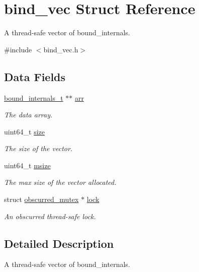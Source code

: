 \hypertarget{structbind__vec}{}\section{bind\+\_\+vec Struct Reference}
\label{structbind__vec}


A thread-\/safe vector of bound\+\_\+internals.  




{\ttfamily \#include $<$bind\+\_\+vec.\+h$>$}

\subsection*{Data Fields}
\begin{DoxyCompactItemize}
\item 
\hyperlink{structbound__internals__t}{bound\+\_\+internals\+\_\+t} $\ast$$\ast$ \hyperlink{structbind__vec_a8bf39e88ad9a1715c7e6cfa4fa8028f4}{arr}
\begin{DoxyCompactList}\small\item\em The data array. \end{DoxyCompactList}\item 
uint64\+\_\+t \hyperlink{structbind__vec_a322fa9fd253719971508bf013a668a64}{size}
\begin{DoxyCompactList}\small\item\em The size of the vector. \end{DoxyCompactList}\item 
uint64\+\_\+t \hyperlink{structbind__vec_aa45fa0f2e32261123f693541f26fc12b}{msize}
\begin{DoxyCompactList}\small\item\em The max size of the vector allocated. \end{DoxyCompactList}\item 
struct \hyperlink{structobscurred__mutex}{obscurred\+\_\+mutex} $\ast$ \hyperlink{structbind__vec_aed0bfcaa51d41aa82c371ab9aad863a6}{lock}
\begin{DoxyCompactList}\small\item\em An obscurred thread-\/safe lock. \end{DoxyCompactList}\end{DoxyCompactItemize}


\subsection{Detailed Description}
A thread-\/safe vector of bound\+\_\+internals. 

